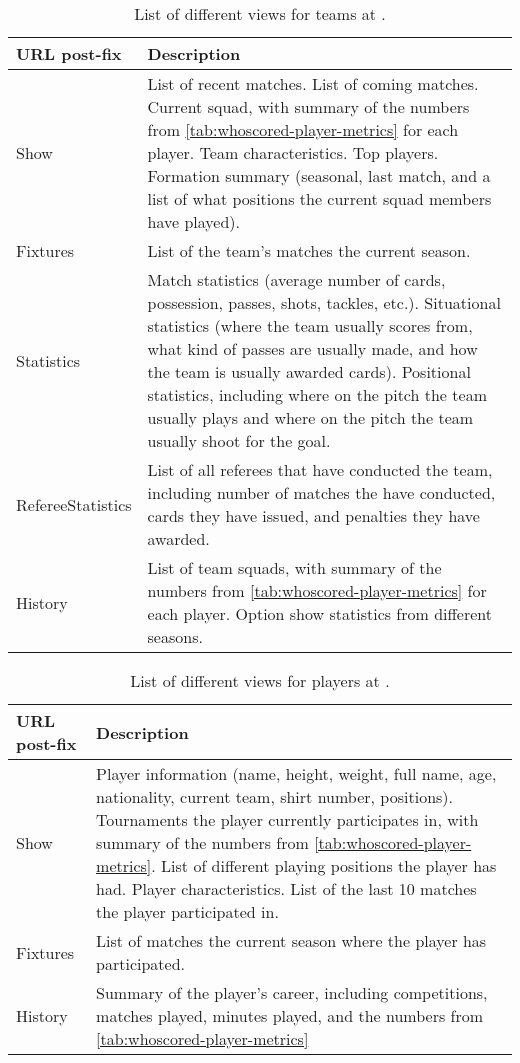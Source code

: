 \begin{table}
    \centering
    \noindent\begin{tabular}{| p{3cm} | p{10cm} |}
        \hline
        \textbf{URL post-fix} & \textbf{Description} \\\hline
        Show & List of recent matches. List of coming matches. Current squad, with summary of the numbers from \cref{tab:whoscored-player-metrics} for each player. Team characteristics. Top players. Formation summary (seasonal, last match, and a list of what positions the current squad members have played). \\\hline
        Fixtures & List of the team's matches the current season. \\\hline
        Statistics & Match statistics (average number of cards, possession, passes, shots, tackles, etc.). Situational statistics (where the team usually scores from, what kind of passes are usually made, and how the team is usually awarded cards). Positional statistics, including where on the pitch the team usually plays and where on the pitch the team usually shoot for the goal. \\\hline
        RefereeStatistics & List of all referees that have conducted the team, including number of matches the have conducted, cards they have issued, and penalties they have awarded. \\\hline
        History & List of team squads, with summary of the numbers from \cref{tab:whoscored-player-metrics} for each player. Option show statistics from different seasons. \\\hline
    \end{tabular}
    \caption{List of different views for teams at \whoscored.}
    \label{tab:whoscored-team-views}
\end{table}

\begin{table}
    \centering
    \noindent\begin{tabular}{| p{3cm} | p{10cm} |}
        \hline
        \textbf{URL post-fix} & \textbf{Description} \\\hline
        Show & Player information (name, height, weight, full name, age, nationality, current team, shirt number, positions). Tournaments the player currently participates in, with summary of the numbers from \cref{tab:whoscored-player-metrics}. List of different playing positions the player has had. Player characteristics. List of the last 10 matches the player participated in. \\\hline
        Fixtures & List of matches the current season where the player has participated. \\\hline
        History & Summary of the player's career, including competitions, matches played, minutes played, and the numbers from \cref{tab:whoscored-player-metrics} \\\hline
    \end{tabular}
    \caption{List of different views for players at \whoscored.}
    \label{tab:whoscored-player-views}
\end{table}


